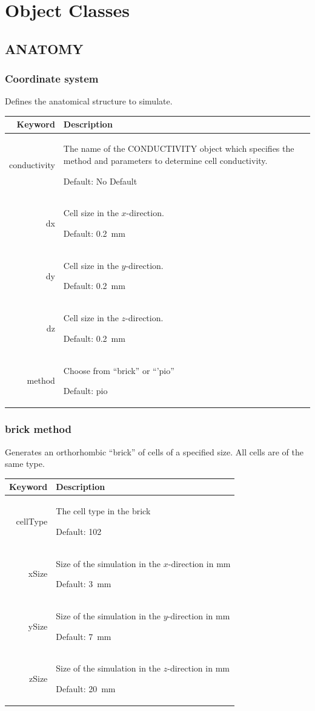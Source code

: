 \documentclass{article}
\begin{document}
\appendix

\section{Object Classes}

\newenvironment{keywords}
{
  \par\vspace{12pt}\noindent
  \begin{tabular}{|r|p{0.7\textwidth}|}
    \hline
    Keyword & Description \\ \hline
  }
  {
  \end{tabular}\par
}

\def\kw#1#2#3{%
  #1 & {#2 \par Default: #3}\\ \hline%
}


\subsection{ANATOMY}

\subsubsection{Coordinate system}


Defines the anatomical structure to simulate.

\begin{keywords}
  \kw{conductivity}{The name of the CONDUCTIVITY object which specifies
    the method and parameters to determine cell conductivity.}{No Default}
  \kw{dx}{Cell size in the $x$-direction.}{0.2~mm}
  \kw{dy}{Cell size in the $y$-direction.}{0.2~mm}
  \kw{dz}{Cell size in the $z$-direction.}{0.2~mm}
  \kw{method}{Choose from ``brick'' or ``'pio''}{pio}
\end{keywords}


\subsubsection{brick method}

Generates an orthorhombic ``brick'' of cells of a specified size.  All
cells are of the same type.


\begin{keywords}
  \kw{cellType}{The cell type in the brick}{102}
  \kw{xSize}{Size of the simulation in the $x$-direction in mm}{3~mm}
  \kw{ySize}{Size of the simulation in the $y$-direction in mm}{7~mm}
  \kw{zSize}{Size of the simulation in the $z$-direction in mm}{20~mm}
\end{keywords}
\end{document}

